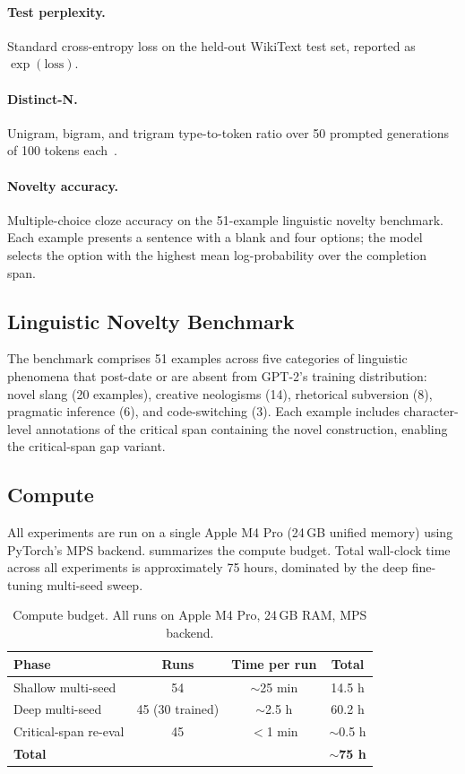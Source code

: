 \documentclass{article}
\begin{document}
\paragraph{Test perplexity.} Standard cross-entropy loss on the held-out WikiText test set, reported as $\exp(\text{loss})$.

\paragraph{Distinct-N.} Unigram, bigram, and trigram type-to-token ratio over 50 prompted generations of 100 tokens each~\citep{li2016diversity}.

\paragraph{Novelty accuracy.} Multiple-choice cloze accuracy on the 51-example linguistic novelty benchmark. Each example presents a sentence with a blank and four options; the model selects the option with the highest mean log-probability over the completion span.

\subsection{Linguistic Novelty Benchmark}

The benchmark comprises 51 examples across five categories of linguistic phenomena that post-date or are absent from GPT-2's training distribution: novel slang (20 examples), creative neologisms (14), rhetorical subversion (8), pragmatic inference (6), and code-switching (3).
Each example includes character-level annotations of the critical span containing the novel construction, enabling the critical-span gap variant.

\subsection{Compute}

All experiments are run on a single Apple M4 Pro (24\,GB unified memory) using PyTorch's MPS backend.
 summarizes the compute budget.
Total wall-clock time across all experiments is approximately 75 hours, dominated by the deep fine-tuning multi-seed sweep.

\begin{table}[htbp]
\centering
\caption{Compute budget. All runs on Apple M4 Pro, 24\,GB RAM, MPS backend.}
\label{tab:compute}
\begin{tabular}{lccc}
\toprule
Phase & Runs & Time per run & Total \\
\midrule
Shallow multi-seed & 54 & $\sim$25 min & 14.5 h \\
Deep multi-seed    & 45 (30 trained) & $\sim$2.5 h & 60.2 h \\
Critical-span re-eval & 45 & $<$1 min & $\sim$0.5 h \\
\midrule
\textbf{Total} & & & $\mathbf{\sim}$\textbf{75 h} \\
\bottomrule
\end{tabular}
\end{table}
\end{document}
